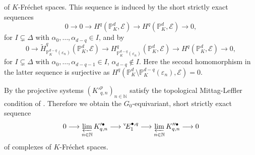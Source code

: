 \documentclass[a4paper, reqno, 10pt]{amsart}
\theoremstyle{definition}
\numberwithin{equation}{section}
\newcommand{\abs}[1]{{\lvert{#1}\rvert}}
\newcommand{\Ind}{{\mathrm{Ind}}}
\newcommand{\lra}{\longrightarrow}
\newcommand{\BN}{{\mathbb {N}}}
\newcommand{\BP}{{\mathbb {P}}}
\newcommand{\CE}{{\mathcal {E}}}
\begin{document}
of $K$-Fr\'echet spaces.
This sequence is induced by the short strictly exact sequences
\begin{equation*}
	0 \lra 0 \lra H^q  (\BP_K^d, \CE) \lra H^q  (\BP_K^d, \CE) \lra 0 ,
\end{equation*}
for $I\subsetneq \Delta$ with $\alpha_0,\ldots, \alpha_{d-q} \in I$, and by
\begin{equation*}
	0 \lra \widetilde{H}^q_{\BP_K^{d-q}(\varepsilon_n)} (\BP_K^d, \CE) \lra H^q_{\BP_K^{d-q}(\varepsilon_n)} (\BP_K^d, \CE) \lra H^q  (\BP_K^d, \CE) \lra 0,
\end{equation*}
for $I\subsetneq \Delta$ with $\alpha_0,\ldots,\alpha_{d-q-1} \in I$, $\alpha_{d-q} \notin I$.
Here the second homomorphism in the latter sequence is surjective as $H^q (\BP_K^d\setminus \BP_K^{d-q}(\varepsilon_n),\CE) =0$.


By  the projective systems $(K'^{p}_{q,n})_{n\in \BN}$ satisfy the topological Mittag-Leffler condition of .
Therefore we obtain the $G_0$-equivariant, short strictly exact sequence 
\begin{equation}\label{Eq 3 - Extension of complexes in projective limit}
	0 \lra \varprojlim_{n\in \BN} K'^{\bullet}_{q,n} \lra {}^{\rm v}\! E_1^{\bullet,q} \lra \varprojlim_{n\in \BN} K''^{\bullet}_{q,n} \lra 0
\end{equation}
of complexes of $K$-Fr\'echet spaces. 
\end{document}
